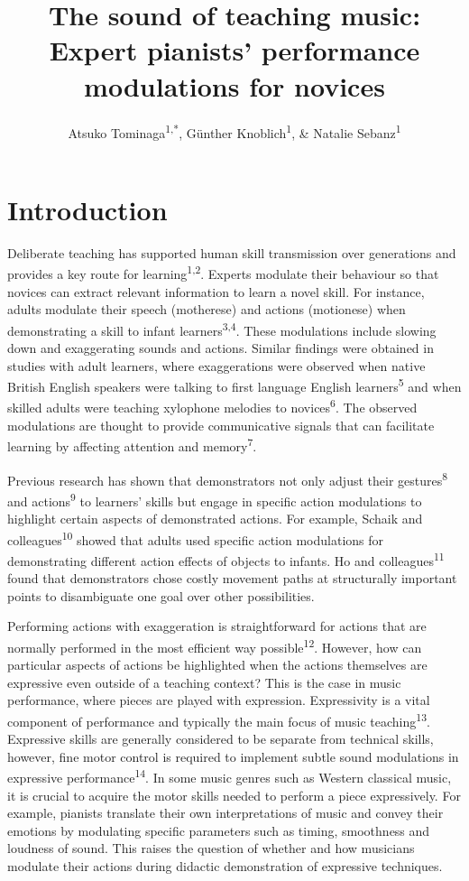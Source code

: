 \documentclass[
  man,floatsintext]{apa6}
\title{The sound of teaching music: Expert pianists' performance modulations for novices}
\author{Atsuko Tominaga\textsuperscript{1,*}, Günther Knoblich\textsuperscript{1}, \& Natalie Sebanz\textsuperscript{1}}
\date{}
\affiliation{\vspace{0.5cm}\textsuperscript{1} Department of Cognitive Science, Central European University, Quellenstraße 51, 1100 Vienna, Austria\\\textsuperscript{*} Corresponding author: \href{mailto:Tominaga_Atsuko@phd.ceu.edu}{\nolinkurl{Tominaga\_Atsuko@phd.ceu.edu}}}
\begin{document}
\maketitle

\hypertarget{introduction}{%
\section{Introduction}\label{introduction}}

Deliberate teaching has supported human skill transmission over generations and provides a key route for learning\textsuperscript{1,2}. Experts modulate their behaviour so that novices can extract relevant information to learn a novel skill. For instance, adults modulate their speech (motherese) and actions (motionese) when demonstrating a skill to infant learners\textsuperscript{3,4}. These modulations include slowing down and exaggerating sounds and actions. Similar findings were obtained in studies with adult learners, where exaggerations were observed when native British English speakers were talking to first language English learners\textsuperscript{5} and when skilled adults were teaching xylophone melodies to novices\textsuperscript{6}. The observed modulations are thought to provide communicative signals that can facilitate learning by affecting attention and memory\textsuperscript{7}.

Previous research has shown that demonstrators not only adjust their gestures\textsuperscript{8} and actions\textsuperscript{9} to learners' skills but engage in specific action modulations to highlight certain aspects of demonstrated actions. For example, Schaik and colleagues\textsuperscript{10} showed that adults used specific action modulations for demonstrating different action effects of objects to infants. Ho and colleagues\textsuperscript{11} found that demonstrators chose costly movement paths at structurally important points to disambiguate one goal over other possibilities.

Performing actions with exaggeration is straightforward for actions that are normally performed in the most efficient way possible\textsuperscript{12}. However, how can particular aspects of actions be highlighted when the actions themselves are expressive even outside of a teaching context? This is the case in music performance, where pieces are played with expression. Expressivity is a vital component of performance and typically the main focus of music teaching\textsuperscript{13}. Expressive skills are generally considered to be separate from technical skills, however, fine motor control is required to implement subtle sound modulations in expressive performance\textsuperscript{14}. In some music genres such as Western classical music, it is crucial to acquire the motor skills needed to perform a piece expressively. For example, pianists translate their own interpretations of music and convey their emotions by modulating specific parameters such as timing, smoothness and loudness of sound. This raises the question of whether and how musicians modulate their actions during didactic demonstration of expressive techniques.
\end{document}
